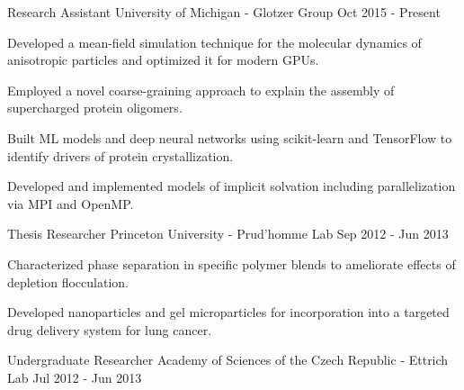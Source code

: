 \newcommand{\ecoli}{\emph{E. coli }}
\newcommand{\ejub}{\emph{E. jubatus }}
\newcommand{\gal}{\emph{G. g. domesticus}}
\begin{cventries}
  \cventry
    {Research Assistant} %
    {University of Michigan - Glotzer Group} %
    {} %
    {Oct 2015 - Present} %
    {
      \begin{cvitems} %
        \item Developed a mean-field simulation technique for the molecular dynamics of anisotropic particles and optimized it for modern GPUs.
        \item Employed a novel coarse-graining approach to explain the assembly of supercharged protein oligomers.
        \item Built ML models and deep neural networks using scikit-learn and TensorFlow to identify drivers of protein crystallization.
        \item Developed and implemented models of implicit solvation including parallelization via MPI and OpenMP.
      \end{cvitems}
    }
  \cventry
    {Thesis Researcher} %
    {Princeton University - Prud'homme Lab} %
    {} %
    {Sep 2012 - Jun 2013} %
    {
      \begin{cvitems} %
        \item Characterized phase separation in specific polymer blends to ameliorate effects of depletion flocculation.
	    \item Developed nanoparticles and gel microparticles for incorporation into a targeted drug delivery system for lung cancer.
      \end{cvitems}
    }
  \cventry
    {Undergraduate Researcher} %
    {Academy of Sciences of the Czech Republic - Ettrich Lab} %
    {} %
    {Jul 2012 - Jun 2013} %
    {
}
\end{cventries}

